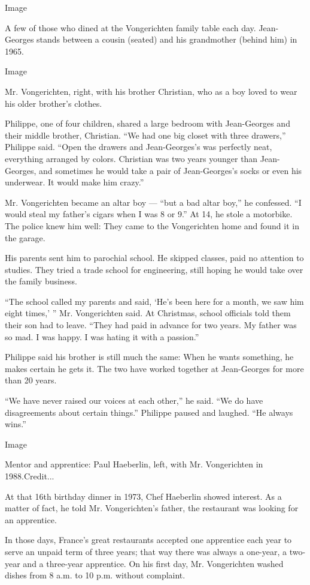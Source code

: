 Image

A few of those who dined at the Vongerichten family table each day.
Jean-Georges stands between a cousin (seated) and his grandmother
(behind him) in 1965.

Image

Mr. Vongerichten, right, with his brother Christian, who as a boy loved
to wear his older brother's clothes.

Philippe, one of four children, shared a large bedroom with Jean-Georges
and their middle brother, Christian. ``We had one big closet with three
drawers,'' Philippe said. ``Open the drawers and Jean-Georges's was
perfectly neat, everything arranged by colors. Christian was two years
younger than Jean-Georges, and sometimes he would take a pair of
Jean-Georges's socks or even his underwear. It would make him crazy.''

Mr. Vongerichten became an altar boy --- ``but a bad altar boy,'' he
confessed. ``I would steal my father's cigars when I was 8 or 9.'' At
14, he stole a motorbike. The police knew him well: They came to the
Vongerichten home and found it in the garage.

His parents sent him to parochial school. He skipped classes, paid no
attention to studies. They tried a trade school for engineering, still
hoping he would take over the family business.

``The school called my parents and said, `He's been here for a month, we
saw him eight times,' '' Mr. Vongerichten said. At Christmas, school
officials told them their son had to leave. ``They had paid in advance
for two years. My father was so mad. I was happy. I was hating it with a
passion.''

Philippe said his brother is still much the same: When he wants
something, he makes certain he gets it. The two have worked together at
Jean-Georges for more than 20 years.

``We have never raised our voices at each other,'' he said. ``We do have
disagreements about certain things.'' Philippe paused and laughed. ``He
always wins.''

Image

Mentor and apprentice: Paul Haeberlin, left, with Mr. Vongerichten in
1988.Credit...

At that 16th birthday dinner in 1973, Chef Haeberlin showed interest. As
a matter of fact, he told Mr. Vongerichten's father, the restaurant was
looking for an apprentice.

In those days, France's great restaurants accepted one apprentice each
year to serve an unpaid term of three years; that way there was always a
one-year, a two-year and a three-year apprentice. On his first day, Mr.
Vongerichten washed dishes from 8 a.m. to 10 p.m. without complaint.

